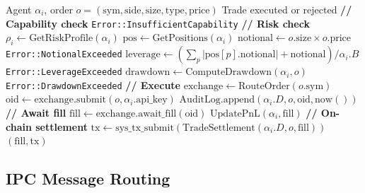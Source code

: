 \documentclass{article}
\begin{document}
\begin{algorithm}[t]
\caption{Trade Execution with Risk Management}
\label{alg:trade}
\begin{algorithmic}[1]
\REQUIRE Agent $\alpha_i$, order $o = (\text{sym}, \text{side}, \text{size}, \text{type}, \text{price})$
\ENSURE Trade executed or rejected
\STATE \textbf{// Capability check}
    \RETURN \texttt{Error::InsufficientCapability}
\ENDIF
\STATE \textbf{// Risk check}
\STATE $\rho_i \leftarrow \text{GetRiskProfile}(\alpha_i)$
\STATE $\text{pos} \leftarrow \text{GetPositions}(\alpha_i)$
\STATE $\text{notional} \leftarrow o.\text{size} \times o.\text{price}$
    \RETURN \texttt{Error::NotionalExceeded}
\ENDIF
\STATE $\text{leverage} \leftarrow (\sum_p |\text{pos}[p].\text{notional}| + \text{notional}) / \alpha_i.B$
    \RETURN \texttt{Error::LeverageExceeded}
\ENDIF
\STATE $\text{drawdown} \leftarrow \text{ComputeDrawdown}(\alpha_i, o)$
    \RETURN \texttt{Error::DrawdownExceeded}
\ENDIF
\STATE \textbf{// Execute}
\STATE $\text{exchange} \leftarrow \text{RouteOrder}(o.\text{sym})$ 
\STATE $\text{oid} \leftarrow \text{exchange}.\text{submit}(o, \alpha_i.\text{api\_key})$
\STATE $\text{AuditLog}.\text{append}(\alpha_i.D, o, \text{oid}, \text{now}())$
\STATE \textbf{// Await fill}
\STATE $\text{fill} \leftarrow \text{exchange}.\text{await\_fill}(\text{oid})$
\STATE $\text{UpdatePnL}(\alpha_i, \text{fill})$
\STATE \textbf{// On-chain settlement}
\STATE $\text{tx} \leftarrow \text{sys\_tx\_submit}(\text{TradeSettlement}(\alpha_i.D, o, \text{fill}))$
\RETURN $(\text{fill}, \text{tx})$
\end{algorithmic}
\end{algorithm}

\subsection{IPC Message Routing}
\end{document}
